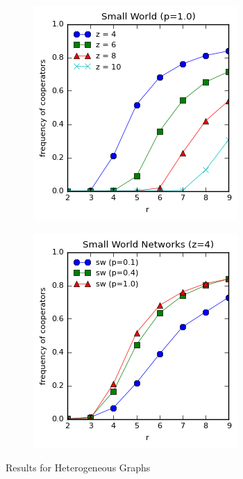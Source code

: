 \documentclass{article}
\begin{document}
\begin{figure}[h]
\begin{subfigure}[b]{0.4\textwidth}
			\caption{}
		\end{subfigure}
		\begin{subfigure}[b]{0.4\textwidth}
			\includegraphics[width=\textwidth]{fig/fixed/heterand.png}
			\caption{}
		\end{subfigure}
		\begin{subfigure}[b]{0.4\textwidth}
			\includegraphics[width=\textwidth]{fig/fixed/smallworld.png}
			\caption{}
		\end{subfigure}
		\caption{Results for Heterogeneous Graphs}
		\label{fig:hetergraphs}
	\end{figure}
\end{document}
